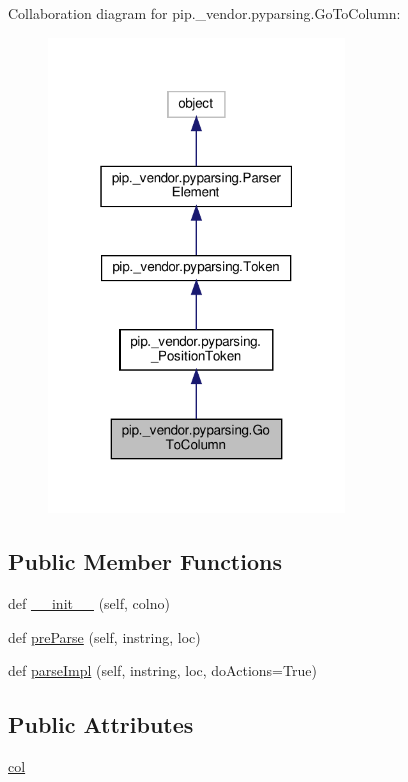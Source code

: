 Collaboration diagram for pip.\+\_\+vendor.\+pyparsing.\+Go\+To\+Column\+:
\nopagebreak
\begin{figure}[H]
\begin{center}
\leavevmode
\includegraphics[width=223pt]{classpip_1_1__vendor_1_1pyparsing_1_1GoToColumn__coll__graph}
\end{center}
\end{figure}
\subsection*{Public Member Functions}
\begin{DoxyCompactItemize}
\item 
def \hyperlink{classpip_1_1__vendor_1_1pyparsing_1_1GoToColumn_aeff8bbd1c30aa99e51777f9a9b325513}{\+\_\+\+\_\+init\+\_\+\+\_\+} (self, colno)
\item 
def \hyperlink{classpip_1_1__vendor_1_1pyparsing_1_1GoToColumn_afe6ab3f4f54d26779663e48b01b0680c}{pre\+Parse} (self, instring, loc)
\item 
def \hyperlink{classpip_1_1__vendor_1_1pyparsing_1_1GoToColumn_ae976646f21ee81af21683ef62ea42b5f}{parse\+Impl} (self, instring, loc, do\+Actions=True)
\end{DoxyCompactItemize}
\subsection*{Public Attributes}
\begin{DoxyCompactItemize}
\item 
\hyperlink{classpip_1_1__vendor_1_1pyparsing_1_1GoToColumn_a00d0bca6d6f5f0984b18f4f9cc90a350}{col}
\end{DoxyCompactItemize}
